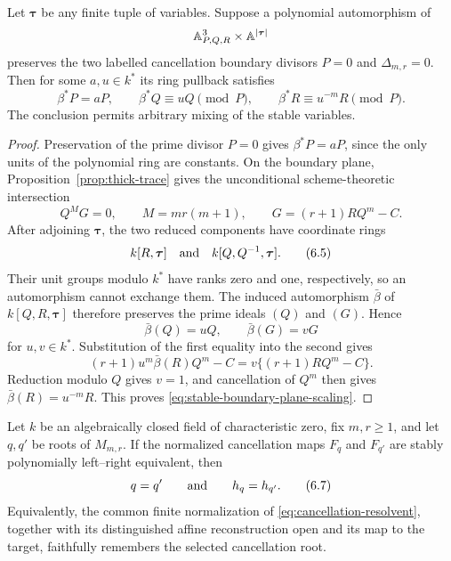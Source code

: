 \begin{lemma}
\label{lem:stable-boundary-plane-scaling}
Let $\boldsymbol\tau$ be any finite tuple of variables.  Suppose a polynomial
automorphism of
\[
 \mathbb A^3_{P,Q,R}\times\mathbb A^{|\boldsymbol\tau|}
\]
preserves the two labelled cancellation boundary divisors $P=0$ and
$\Delta_{m,r}=0$.  Then for some $a,u\in k^*$ its ring pullback satisfies
\[
 \beta^*P=aP,
 \qquad
 \beta^*Q\equiv uQ\pmod P,
 \qquad
 \beta^*R\equiv u^{-m}R\pmod P.                       \tag{6.3}
 \label{eq:stable-boundary-plane-scaling}
\]
The conclusion permits arbitrary mixing of the stable variables.
\end{lemma}

\begin{proof}
Preservation of the prime divisor $P=0$ gives $\beta^*P=aP$, since the
only units of the polynomial ring are constants.  On the boundary plane,
Proposition~\ref{prop:thick-trace} gives the unconditional scheme-theoretic
intersection
\[
 Q^M G=0,
 \qquad
 M=mr(m+1),
 \qquad
 G=(r+1)RQ^m-C.                                        \tag{6.4}
\]
After adjoining $\boldsymbol\tau$, the two reduced components have coordinate
rings
\[
 k[R,\boldsymbol\tau]
 \quad\hbox{and}\quad
 k[Q,Q^{-1},\boldsymbol\tau].                          \tag{6.5}
\]
Their unit groups modulo $k^*$ have ranks zero and one, respectively, so an
automorphism cannot exchange them.  The induced automorphism $\bar\beta$ of
$k[Q,R,\boldsymbol\tau]$ therefore preserves the prime ideals $(Q)$ and
$(G)$.  Hence
\[
 \bar\beta(Q)=uQ,
 \qquad
 \bar\beta(G)=vG                                      \tag{6.6}
\]
for $u,v\in k^*$.  Substitution of the first equality into the second gives
\[
 (r+1)u^m\bar\beta(R)Q^m-C
 =v\{(r+1)RQ^m-C\}.
\]
Reduction modulo $Q$ gives $v=1$, and cancellation of $Q^m$ then gives
$\bar\beta(R)=u^{-m}R$.  This proves
\eqref{eq:stable-boundary-plane-scaling}.
\end{proof}

\begin{theorem}
\label{thm:cancellation-parameter-faithfulness}
Let $k$ be an algebraically closed field of characteristic zero, fix
$m,r\geq1$, and let $q,q'$ be roots of $M_{m,r}$.  If the normalized
cancellation maps $F_q$ and $F_{q'}$ are stably polynomially left--right
equivalent, then
\[
 q=q'\qquad\hbox{and}\qquad h_q=h_{q'}.
                                                               \tag{6.7}
\]
Equivalently, the common finite normalization of
\eqref{eq:cancellation-resolvent}, together with
its distinguished affine reconstruction open and its map to the target,
faithfully remembers the selected cancellation root.
\end{theorem}

